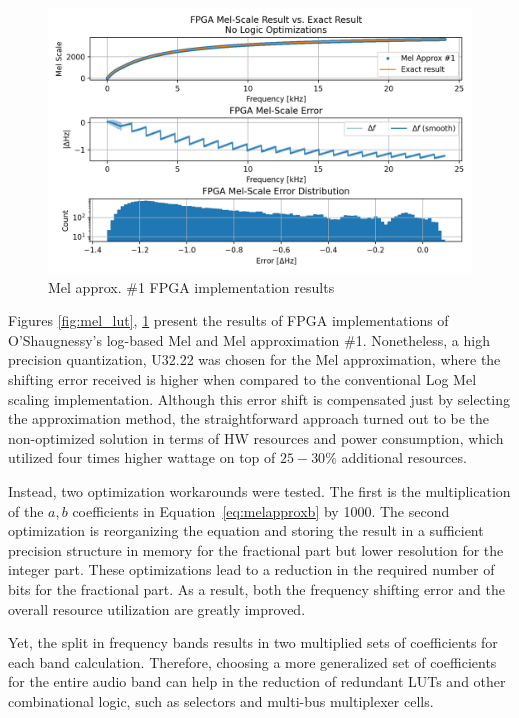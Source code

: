 \begin{figure}[H]
    \centering
    \includegraphics[width=\linewidth]{Scaling/images/mel_approx_no_opt}
    \caption{Mel approx. \#1 FPGA implementation results}\label{fig:mel_approx_no_opt}
\end{figure}

Figures \ref{fig:mel_lut}, \ref{fig:mel_approx_no_opt} 
present the results of FPGA implementations
of O'Shaugnessy's log-based Mel and Mel approximation \#1.
Nonetheless, a high precision quantization, U32.22 was chosen
for the Mel approximation, where 
the shifting error received is higher when compared 
to the conventional Log Mel scaling implementation.
Although this error shift is compensated 
just by selecting the approximation method, 
the straightforward approach 
turned out to be the non-optimized solution 
in terms of HW resources and power consumption,
which utilized four times higher wattage on top of \(25 - 30 \%\) 
additional resources.

Instead, two optimization workarounds were tested.
The first is the multiplication of the \(a, b\) coefficients
in Equation~\ref{eq:melapproxb} by 1000. 
The second optimization is reorganizing the equation
and storing the result in a sufficient precision structure in memory
for the fractional part but lower resolution for the integer part.  
These optimizations lead to a reduction in the 
required number of bits for the fractional part.
As a result, both the frequency shifting error 
and the overall resource utilization are greatly improved.

Yet, the split in frequency bands results in two multiplied sets
of coefficients for each band calculation.
Therefore, choosing a more generalized set 
of coefficients for the entire audio band can help 
in the reduction of redundant LUTs and other combinational logic, 
such as selectors and multi-bus multiplexer cells.

